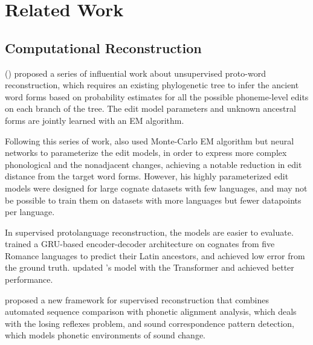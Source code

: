 \section{Related Work} \label{related-work}

\subsection{Computational Reconstruction} \label{related-work-reconstruct}

 \citeauthor{bouchard-2007a} (\citeyear{bouchard-2007a, bouchard-2007b,bouchard-2009,bouchard-2013}) proposed a series of influential work about unsupervised proto-word reconstruction, which requires an existing phylogenetic tree to infer the ancient word forms based on probability estimates for all the possible phoneme-level edits on each branch of the tree. The edit model parameters and unknown ancestral forms are jointly learned with an EM algorithm. 

Following this series of work, \citet{he-etal-2023-neural} also used Monte-Carlo EM algorithm but neural networks to parameterize the edit models, in order to express more complex phonological and the nonadjacent changes, achieving a notable reduction in edit distance from the target word forms. However, his highly parameterized edit models were designed for large cognate datasets with few languages, and may not be possible to train them on datasets with more languages but fewer datapoints per language. 

In supervised protolanguage reconstruction, the models are easier to evaluate. \citet{meloni-2021} trained a GRU-based encoder-decoder architecture on cognates from five Romance languages to predict their Latin ancestors, and achieved low error from the ground truth. \citet{kim-etal-2023-transformed} updated \citeauthor{meloni-2021}'s model with the Transformer and achieved better performance.

\citet{list-etal-2022-new} proposed a new framework for supervised reconstruction that combines automated sequence comparison with phonetic alignment analysis, which deals with the losing reflexes problem, and sound correspondence pattern detection, which models phonetic environments of sound change. 

